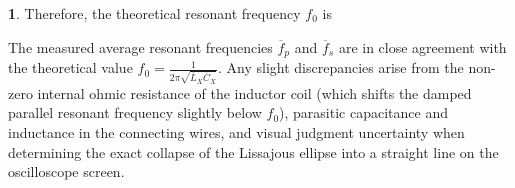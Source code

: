 \documentclass[12pt,oneside,a4paper]{article}
\theoremstyle{definition}
\newtheorem{bt}{}
\begin{document}
\begin{bt}
		\noindent
		Therefore, the theoretical resonant frequency $f_0$ is
		\begin{center}
		\end{center}
		
		\noindent
		The measured average resonant frequencies $\overline{f}_p$ and $\overline{f}_s$ are in close agreement with the theoretical value $f_0 = \frac{1}{2\pi\sqrt{\overline{L}_X \overline{C}_X}}$. Any slight discrepancies arise from the non-zero internal ohmic resistance of the inductor coil (which shifts the damped parallel resonant frequency slightly below $f_0$), parasitic capacitance and inductance in the connecting wires, and visual judgment uncertainty when determining the exact collapse of the Lissajous ellipse into a straight line on the oscilloscope screen.
	\end{bt}
	
\end{document}
